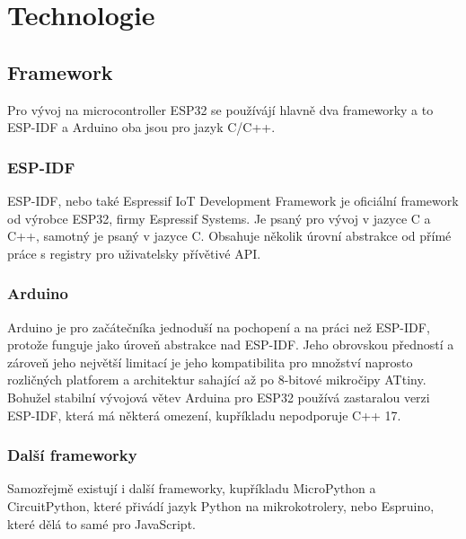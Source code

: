 \chapter{Technologie}

\section{Framework}

Pro vývoj na microcontroller ESP32 se používájí hlavně dva frameworky a to ESP-IDF\cite{ESP-IDF} a Arduino\cite{arduino} oba jsou pro jazyk C/C++.

\subsection{ESP-IDF}

ESP-IDF, nebo také Espressif IoT Development Framework je oficiální framework od výrobce ESP32, firmy Espressif Systems\cite{espressif}.
Je psaný pro vývoj v jazyce C a C++, samotný je psaný v jazyce C.
Obsahuje několik úrovní abstrakce od přímé práce s registry pro uživatelsky přívětivé API.





\subsection{Arduino}

Arduino je pro začátečníka jednoduší na pochopení a na práci než ESP-IDF, protože funguje jako úroveň abstrakce nad ESP-IDF.
Jeho obrovskou předností a zároveň jeho největší limitací je jeho kompatibilita pro množství naprosto rozličných platforem a architektur sahající až po 8-bitové mikročipy ATtiny. Bohužel stabilní vývojová větev Arduina pro ESP32 používá zastaralou verzi ESP-IDF, která má některá omezení, kupříkladu nepodporuje C++ 17.



\subsection{Další frameworky}

Samozřejmě existují i další frameworky, kupříkladu MicroPython\cite{uPython} a CircuitPython\cite{circuitPython}, které přivádí jazyk Python na mikrokotrolery, nebo Espruino\cite{espruino}, které dělá to samé pro JavaScript.

